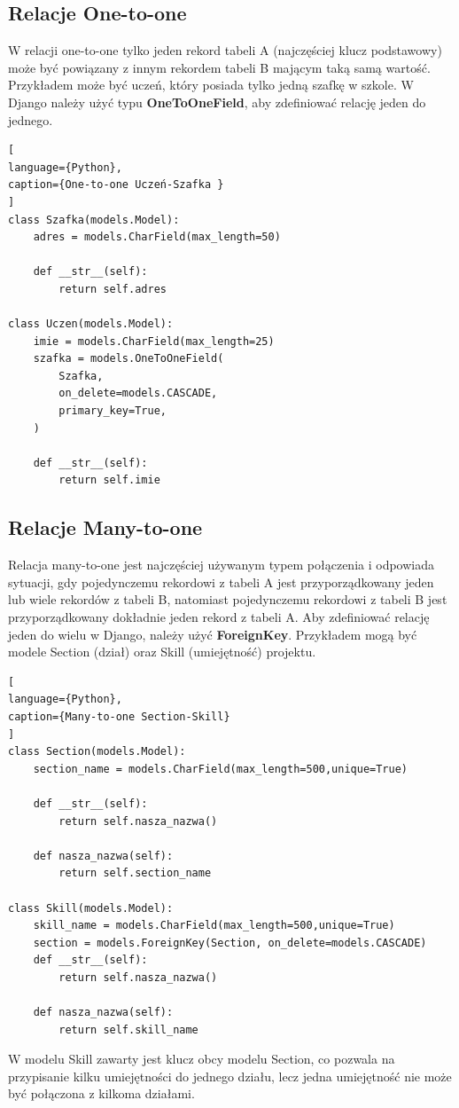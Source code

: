 \documentclass[oneside,polski,logo,indent]{amuthesis}
\begin{document}
\begin{enumerate}
\begin{enumerate}
\subsection{Relacje One-to-one}
W relacji one-to-one tylko jeden rekord tabeli A (najczęściej klucz podstawowy) może być powiązany z innym rekordem tabeli B mającym taką samą wartość. Przykładem może być uczeń, który posiada tylko jedną szafkę w szkole.
W Django należy użyć typu \textbf{OneToOneField}, aby zdefiniować relację jeden do jednego.
\begin{lstlisting}[
language={Python},
caption={One-to-one Uczeń-Szafka }
]
class Szafka(models.Model):
    adres = models.CharField(max_length=50)

    def __str__(self):
        return self.adres

class Uczen(models.Model):
    imie = models.CharField(max_length=25)
    szafka = models.OneToOneField(
        Szafka,
        on_delete=models.CASCADE,
        primary_key=True,
    )

    def __str__(self):
        return self.imie
\end{lstlisting}
\subsection{Relacje Many-to-one}

Relacja many-to-one jest najczęściej używanym typem połączenia i odpowiada sytuacji, gdy pojedynczemu rekordowi z tabeli A jest przyporządkowany jeden lub wiele rekordów z tabeli B, natomiast pojedynczemu rekordowi z tabeli B jest przyporządkowany dokładnie jeden rekord z tabeli A.
Aby zdefiniować relację jeden do wielu w Django, należy użyć \textbf{ForeignKey}. Przykładem mogą być modele Section (dział) oraz Skill (umiejętność) projektu.
\begin{lstlisting}[
language={Python},
caption={Many-to-one Section-Skill}
]
class Section(models.Model):
    section_name = models.CharField(max_length=500,unique=True)

    def __str__(self):
        return self.nasza_nazwa()

    def nasza_nazwa(self):
        return self.section_name

class Skill(models.Model):
    skill_name = models.CharField(max_length=500,unique=True)
    section = models.ForeignKey(Section, on_delete=models.CASCADE)
    def __str__(self):
        return self.nasza_nazwa()

    def nasza_nazwa(self):
        return self.skill_name
\end{lstlisting}
W modelu Skill zawarty jest klucz obcy modelu Section, co pozwala na przypisanie kilku umiejętności do jednego działu, lecz jedna umiejętność nie może być połączona z kilkoma działami.

\end{enumerate}
\end{enumerate}
\end{document}
